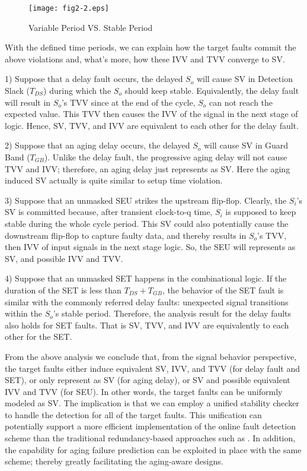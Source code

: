 \begin{figure}[ht]
\centering
\texttt{[image: fig2-2.eps]}
   \vspace{-0.5em}
   \caption{Variable Period VS. Stable Period}
   \label{tvts}
\end{figure}

With the defined time periods, we can explain how the target faults commit the above violations and, what's more, how these IVV and TVV converge to SV.

1) Suppose that a delay fault occurs, the delayed $S_o$ will cause SV in Detection Slack ($T_{DS}$) during which the $S_o$ should keep stable. Equivalently, the delay fault will result in $S_o$'s TVV since at the end of the cycle, $S_o$ can not reach the expected value. This TVV then causes the IVV of the signal in the next stage of logic. Hence, SV, TVV, and IVV are equivalent to each other for the delay fault.

2) Suppose that an aging delay occurs, the delayed $S_o$ will cause SV in Guard Band ($T_{GB}$). Unlike the delay fault, the progressive aging delay will not cause TVV and IVV; therefore, an aging delay just represents as SV. Here the aging induced SV actually is quite similar to setup time violation.

3) Suppose that an unmasked SEU strikes the upstream flip-flop. Clearly, the $S_i$'s SV is committed because, after transient clock-to-q time, $S_i$ is supposed to keep stable during the whole cycle period. This SV could also potentially cause the downstream flip-flop to capture faulty data, and thereby results in $S_o$'s TVV, then IVV of input signals in the next stage logic. So, the SEU will represents as SV, and possible IVV and TVV.

4) Suppose that an unmasked SET happens in the combinational logic. If the duration of the SET is less than $T_{DS}+T_{GB}$, the behavior of the SET fault is similar with the commonly referred delay faults: unexpected signal transitions within the $S_o$'s stable period. Therefore, the analysis result for the delay faults also holds for SET faults. That is SV, TVV, and IVV are equivalently to each other for the SET.

From the above analysis we conclude that, from the signal behavior perspective, the target faults either induce equivalent SV, IVV, and TVV (for delay fault and SET), or only represent as SV (for aging delay), or SV and possible equivalent IVV and TVV (for SEU). In other words, the target faults can be uniformly modeled as SV. The implication is that we can employ a unified stability checker to handle the detection for all of the target faults. This unification can potentially support a more efficient implementation of the online fault detection scheme than the traditional redundancy-based approaches such as \cite{Mitra_C05}\cite{Han_DT05}. In addition, the capability for aging failure prediction \cite{failure_prediction_07}\cite{failure_prediction2_08} can be exploited in place with the same scheme; thereby greatly facilitating the aging-aware designs.

